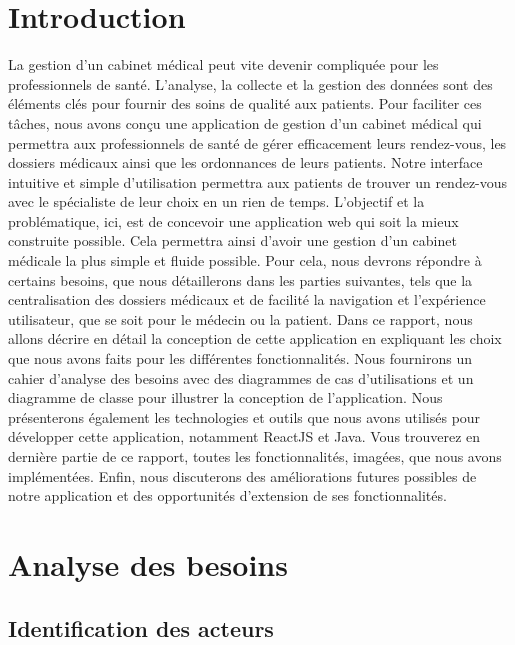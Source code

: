 \documentclass[a4paper]{report}
\begin{document}
\chapter{Introduction}

La gestion d'un cabinet médical peut vite devenir compliquée pour les professionnels de santé. L'analyse, la collecte et la gestion des données sont des éléments 
clés pour fournir des soins de qualité aux patients. Pour faciliter ces tâches, nous avons conçu une application de gestion d'un cabinet 
médical qui permettra aux professionnels de santé de gérer efficacement leurs rendez-vous, les dossiers médicaux ainsi que les ordonnances de leurs patients. 
Notre interface intuitive et simple d'utilisation permettra aux patients de trouver un rendez-vous avec le spécialiste de leur choix en un rien de temps. \newline\newline
L'objectif et la problématique, ici, est de concevoir une application web qui soit la mieux construite possible. Cela permettra ainsi d'avoir une gestion d'un cabinet 
médicale la plus simple et fluide possible. Pour cela, nous devrons répondre à certains besoins, que nous détaillerons dans les parties suivantes, tels que la centralisation des dossiers médicaux
et de facilité la navigation et l'expérience utilisateur, que se soit pour le médecin ou la patient.
 \newline\newline
Dans ce rapport, nous allons décrire en détail la conception de cette application en expliquant les choix que nous avons faits 
pour les différentes fonctionnalités. Nous fournirons un cahier d'analyse des besoins avec des diagrammes de cas d'utilisations et
un diagramme de classe pour illustrer la conception de l'application. Nous présenterons également 
les technologies et outils que nous avons utilisés pour développer cette application, notamment ReactJS et Java.
Vous trouverez en dernière partie de ce rapport, toutes les fonctionnalités, imagées, que nous avons implémentées.
\newline\newline
Enfin, nous discuterons des améliorations futures possibles de notre application et des opportunités d'extension de ses fonctionnalités.

\chapter{Analyse des besoins}\label{besoins}
\section{Identification des acteurs}
\end{document}
